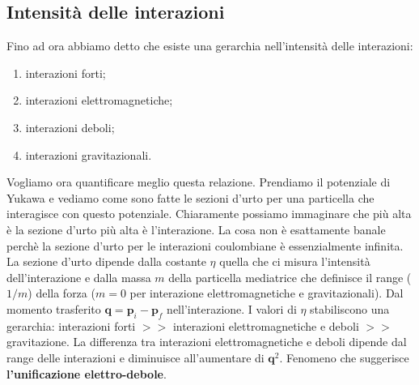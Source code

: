 \subsection{Intensità delle interazioni}
Fino ad ora abbiamo detto che esiste una gerarchia nell'intensità delle interazioni:
\begin{enumerate}
    \item interazioni forti;
    \item interazioni elettromagnetiche;
    \item interazioni deboli;
    \item interazioni gravitazionali.
\end{enumerate}
Vogliamo ora quantificare meglio questa relazione. Prendiamo il potenziale di Yukawa e vediamo come sono fatte le sezioni d'urto per una particella che interagisce con questo potenziale. Chiaramente possiamo immaginare che più alta è la sezione d'urto più alta è l'interazione. La cosa non è esattamente banale perchè la sezione d'urto per le interazioni coulombiane è essenzialmente infinita. La sezione d'urto dipende dalla costante $\eta$ quella che ci misura l'intensità dell'interazione e dalla massa $m$ della particella mediatrice che definisce il range ($1/m$) della forza ($m=0$ per interazione elettromagnetiche e gravitazionali). Dal momento trasferito $\mathbf{q}=\mathbf{p}_i-\mathbf{p}_f$ nell'interazione.
I valori di $\eta$ stabiliscono una gerarchia: interazioni forti $>>$ interazioni elettromagnetiche e deboli $>>$ gravitazione. La differenza tra interazioni elettromagnetiche e deboli dipende dal range delle interazioni e diminuisce all'aumentare di $\mathbf{q}^2$. Fenomeno che suggerisce \textbf{l'unificazione elettro-debole}.
